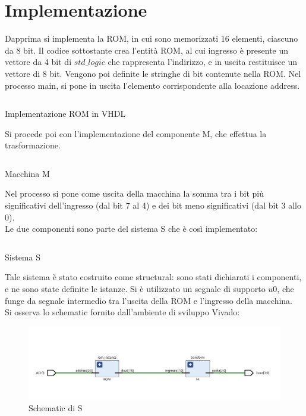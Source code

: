 \section{Implementazione}
Dapprima si implementa la ROM, in cui sono memorizzati 16 elementi, ciascuno da 8 bit. Il codice sottostante crea l'entità ROM, al cui ingresso è presente un vettore da 4 bit di $std\_logic$ che rappresenta l'indirizzo, e in uscita restituisce un vettore di 8 bit. Vengono poi definite le stringhe di bit contenute nella ROM. Nel processo main, si pone in uscita l'elemento corrispondente alla locazione address.\\
\begin{code}
    \inputminted[frame=lines, framesep=2mm, baselinestretch=1.2, bgcolor=LightGray, fontsize=\footnotesize, linenos]{vhdl}{vhdl_files/ROM.vhd}
    \caption{Implementazione ROM in VHDL}
    \label{lst:ROM}
\end{code}
Si procede poi con l'implementazione del componente M, che effettua la trasformazione.
\begin{code}
    \inputminted[frame=lines, framesep=2mm, baselinestretch=1.2, bgcolor=LightGray, fontsize=\footnotesize, linenos]{vhdl}{vhdl_files/M.vhd}
    \caption{Macchina M}
    \label{lst:M}
\end{code}
Nel processo si pone come uscita della macchina la somma tra i bit più significativi dell'ingresso (dal bit 7 al 4) e dei bit meno significativi (dal bit 3 allo 0).\\
Le due componenti sono parte del sistema S che è così implementato:
\begin{code}
    \inputminted[frame=lines, framesep=2mm, baselinestretch=1.2, bgcolor=LightGray, fontsize=\footnotesize, linenos]{vhdl}{vhdl_files/ROMplusM.vhd}
    \caption{Sistema S}
    \label{lst:S}
\end{code}
Tale sistema è stato costruito come structural: sono stati dichiarati i componenti, e ne sono state definite le istanze. Si è utilizzato un segnale di supporto $u0$, che funge da segnale intermedio tra l'uscita della ROM e l'ingresso della macchina. \\
Si osserva lo schematic fornito dall'ambiente di sviluppo Vivado:
\begin{figure}[H]
	\centering
	\includegraphics[width=1\textwidth]{img/ROM_plus_M}
	\caption{Schematic di S}
	\label{SchemS} 
\end{figure}

